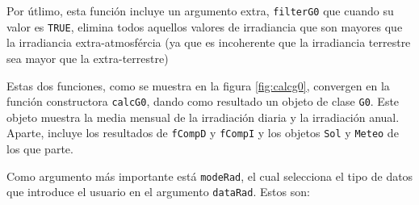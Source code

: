 \begin{itemize}
Por útlimo, esta función incluye un argumento extra, \texttt{filterG0} que cuando su valor es \texttt{TRUE}, elimina todos aquellos valores de irradiancia que son mayores que la irradiancia extra-atmosfércia (ya que es incoherente que la irradiancia terrestre sea mayor que la extra-terrestre)
\end{itemize}

Estas dos funciones, como se muestra en la figura \ref{fig:calcg0}, convergen en la función constructora \texttt{calcG0}, dando como resultado un objeto de clase \texttt{G0}. Este objeto muestra la media mensual de la irradiación diaria y la irradiación anual. Aparte, incluye los resultados de \texttt{fCompD} y \texttt{fCompI} y los objetos \texttt{Sol} y \texttt{Meteo} de los que parte.

Como argumento más importante está \texttt{modeRad}, el cual selecciona el tipo de datos que introduce el usuario en el argumento \texttt{dataRad}. Estos son:
